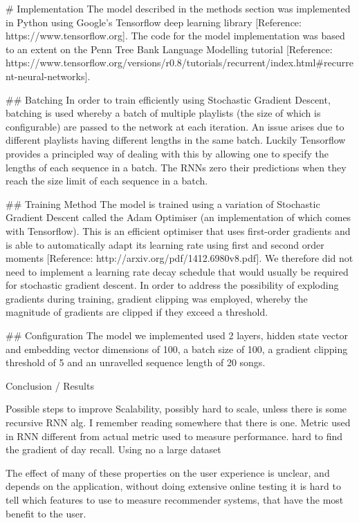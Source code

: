 \documentclass{article} %
\begin{document}
# Implementation
The model described in the methods section was implemented in Python using Google's Tensorflow deep learning library [Reference: https://www.tensorflow.org]. The code for the model implementation was based to an extent on the Penn Tree Bank Language Modelling tutorial [Reference: https://www.tensorflow.org/versions/r0.8/tutorials/recurrent/index.html#recurrent-neural-networks]. 

## Batching
In order to train efficiently using Stochastic Gradient Descent, batching is used whereby a batch of multiple playlists (the size of which is configurable) are passed to the network at each iteration. An issue arises due to different playlists having different lengths in the same batch. Luckily Tensorflow provides a principled way of dealing with this by allowing one to specify the lengths of each sequence in a batch. The RNNs zero their predictions when they reach the size limit of each sequence in a batch. 

## Training Method
The model is trained using a variation of Stochastic Gradient Descent called the Adam Optimiser (an implementation of which comes with Tensorflow). This is an efficient optimiser that uses first-order gradients and is able to automatically adapt its learning rate using first and second order moments [Reference: http://arxiv.org/pdf/1412.6980v8.pdf]. We therefore did not need to implement a learning rate decay schedule that would usually be required for stochastic gradient descent. In order to address the possibility of exploding gradients during training, gradient clipping was employed, whereby the magnitude of gradients are clipped if they exceed a threshold. 

## Configuration
The model we implemented used 2 layers, hidden state vector and embedding vector dimensions of 100, a batch size of 100, a gradient clipping threshold of 5 and an unravelled sequence length of 20 songs. 

Conclusion / Results


Possible steps to improve
Scalability, possibly hard to scale, unless there is some recursive RNN alg. I remember reading somewhere that there is one.
Metric used in RNN different from actual metric used to measure performance.
	hard to find the gradient of day recall.
Using no a large dataset

The effect of many of these properties on the user experience is unclear, and depends on the application, without doing extensive online testing it is hard to tell which features to use to measure recommender systems, that have the most benefit to the user.
\end{document}
